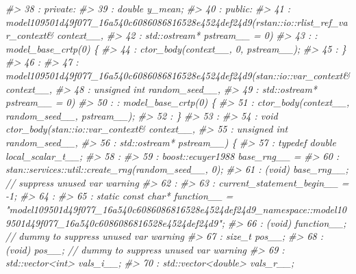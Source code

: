 \documentclass[
  10pt,
  italian,
  a4paper,
  extrafontsizes,onecolumn,openright
  ]{memoir}
\newenvironment{Shaded}{\begin{snugshade}}{\end{snugshade}}
\newcommand{\CommentTok}[1]{\textcolor[rgb]{0.56,0.35,0.01}{\textit{#1}}}
\begin{document}
\begin{Shaded}
\begin{Highlighting}[]
\CommentTok{\#\textgreater{}   38 : private:}
\CommentTok{\#\textgreater{}   39 :         double y\_mean;}
\CommentTok{\#\textgreater{}   40 : public:}
\CommentTok{\#\textgreater{}   41 :     model109501d49f077\_16a540c6086086816528e4524def24d9(rstan::io::rlist\_ref\_var\_context\& context\_\_,}
\CommentTok{\#\textgreater{}   42 :         std::ostream* pstream\_\_ = 0)}
\CommentTok{\#\textgreater{}   43 :         : model\_base\_crtp(0) \{}
\CommentTok{\#\textgreater{}   44 :         ctor\_body(context\_\_, 0, pstream\_\_);}
\CommentTok{\#\textgreater{}   45 :     \}}
\CommentTok{\#\textgreater{}   46 : }
\CommentTok{\#\textgreater{}   47 :     model109501d49f077\_16a540c6086086816528e4524def24d9(stan::io::var\_context\& context\_\_,}
\CommentTok{\#\textgreater{}   48 :         unsigned int random\_seed\_\_,}
\CommentTok{\#\textgreater{}   49 :         std::ostream* pstream\_\_ = 0)}
\CommentTok{\#\textgreater{}   50 :         : model\_base\_crtp(0) \{}
\CommentTok{\#\textgreater{}   51 :         ctor\_body(context\_\_, random\_seed\_\_, pstream\_\_);}
\CommentTok{\#\textgreater{}   52 :     \}}
\CommentTok{\#\textgreater{}   53 : }
\CommentTok{\#\textgreater{}   54 :     void ctor\_body(stan::io::var\_context\& context\_\_,}
\CommentTok{\#\textgreater{}   55 :                    unsigned int random\_seed\_\_,}
\CommentTok{\#\textgreater{}   56 :                    std::ostream* pstream\_\_) \{}
\CommentTok{\#\textgreater{}   57 :         typedef double local\_scalar\_t\_\_;}
\CommentTok{\#\textgreater{}   58 : }
\CommentTok{\#\textgreater{}   59 :         boost::ecuyer1988 base\_rng\_\_ =}
\CommentTok{\#\textgreater{}   60 :           stan::services::util::create\_rng(random\_seed\_\_, 0);}
\CommentTok{\#\textgreater{}   61 :         (void) base\_rng\_\_;  // suppress unused var warning}
\CommentTok{\#\textgreater{}   62 : }
\CommentTok{\#\textgreater{}   63 :         current\_statement\_begin\_\_ = {-}1;}
\CommentTok{\#\textgreater{}   64 : }
\CommentTok{\#\textgreater{}   65 :         static const char* function\_\_ = "model109501d49f077\_16a540c6086086816528e4524def24d9\_namespace::model109501d49f077\_16a540c6086086816528e4524def24d9";}
\CommentTok{\#\textgreater{}   66 :         (void) function\_\_;  // dummy to suppress unused var warning}
\CommentTok{\#\textgreater{}   67 :         size\_t pos\_\_;}
\CommentTok{\#\textgreater{}   68 :         (void) pos\_\_;  // dummy to suppress unused var warning}
\CommentTok{\#\textgreater{}   69 :         std::vector\textless{}int\textgreater{} vals\_i\_\_;}
\CommentTok{\#\textgreater{}   70 :         std::vector\textless{}double\textgreater{} vals\_r\_\_;}

\end{Highlighting}
\end{Shaded}
\end{document}
